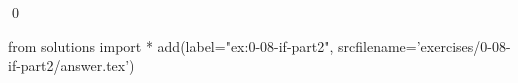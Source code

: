 
\begin{ex}
  \label{ex:0-08-if-part2}
  
  \qed
\end{ex}
\begin{python0}
from solutions import *
add(label="ex:0-08-if-part2",
    srcfilename='exercises/0-08-if-part2/answer.tex')
\end{python0}
